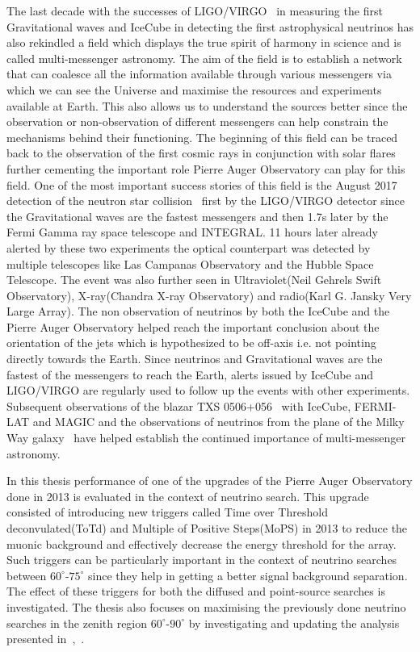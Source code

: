The last decade with the successes of LIGO/VIRGO~\cite{} in measuring the first Gravitational waves and IceCube in detecting the first astrophysical neutrinos has also rekindled a field which displays the true spirit of harmony in science and is called multi-messenger astronomy. The aim of the field is to establish a network that can coalesce all the  information available through various messengers via which we can see the Universe and maximise the resources and experiments available at Earth. This also allows us to understand the sources better since the observation or non-observation of different messengers can help constrain the mechanisms behind their functioning. The beginning of this field can be traced back to the observation of the first cosmic rays in conjunction with solar flares further cementing the important role Pierre Auger Observatory can play for this field. One of the most important success stories of this field is the August 2017 detection of the neutron star collision~\cite{} first by the LIGO/VIRGO detector since the Gravitational waves are the fastest messengers and then 1.7s later by the Fermi Gamma ray space telescope and INTEGRAL. 11 hours later already alerted by these two experiments the optical counterpart was detected by multiple telescopes like Las Campanas Observatory and the Hubble Space Telescope. The event was also further seen in Ultraviolet(Neil Gehrels Swift Observatory), X-ray(Chandra X-ray Observatory) and radio(Karl G. Jansky Very Large Array). The non observation of neutrinos by both the IceCube and the Pierre Auger Observatory helped reach the important conclusion about the orientation of the jets which is hypothesized to be off-axis i.e. not pointing directly towards the Earth. Since neutrinos and Gravitational waves are the fastest of the messengers to reach the Earth, alerts issued by IceCube and LIGO/VIRGO are regularly used to follow up the events with other experiments. Subsequent observations of the blazar TXS 0506+056~\cite{} with IceCube, FERMI-LAT and MAGIC and the observations of neutrinos from the plane of the Milky Way galaxy~\cite{} have helped establish the continued importance of multi-messenger astronomy.

In this thesis performance of one of the upgrades of the Pierre Auger Observatory done in 2013 is evaluated in the context of neutrino search. This upgrade consisted of introducing new triggers called Time over Threshold deconvulated(ToTd) and Multiple of Positive Steps(MoPS) in 2013 to reduce the muonic background and effectively decrease the energy threshold for the array. Such triggers can be particularly important in the context of neutrino searches between $60^\circ$-$75^\circ$ since they help in getting a better signal background separation. The effect of these triggers for both the diffused and point-source searches is investigated. The thesis also focuses on maximising the previously done neutrino searches in the zenith region $60^\circ$-$90^\circ$ by investigating and updating the analysis presented in~\cite{},~\cite{}.

